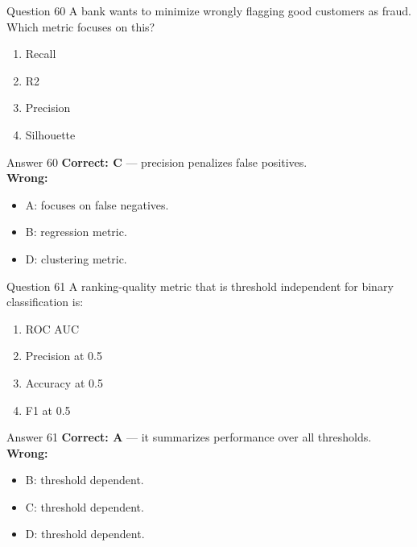 \documentclass[aspectratio=169,11pt]{beamer}
\begin{document}
\begin{frame}{Question 60}
A bank wants to minimize wrongly flagging good customers as fraud. Which metric focuses on this?
\begin{enumerate}[label=\Alph*.]
\item Recall
\item R2
\item Precision
\item Silhouette
\end{enumerate}
\end{frame}
\begin{frame}{Answer 60}
\textbf{Correct: C} --- precision penalizes false positives.\\
\vspace{0.5em}
\textbf{Wrong:}
\begin{itemize}
\item A: focuses on false negatives.
\item B: regression metric.
\item D: clustering metric.
\end{itemize}
\end{frame}

\begin{frame}{Question 61}
A ranking-quality metric that is threshold independent for binary classification is:
\begin{enumerate}[label=\Alph*.]
\item ROC AUC
\item Precision at 0.5
\item Accuracy at 0.5
\item F1 at 0.5
\end{enumerate}
\end{frame}
\begin{frame}{Answer 61}
\textbf{Correct: A} --- it summarizes performance over all thresholds.\\
\vspace{0.5em}
\textbf{Wrong:}
\begin{itemize}
\item B: threshold dependent.
\item C: threshold dependent.
\item D: threshold dependent.
\end{itemize}
\end{frame}
\end{document}
